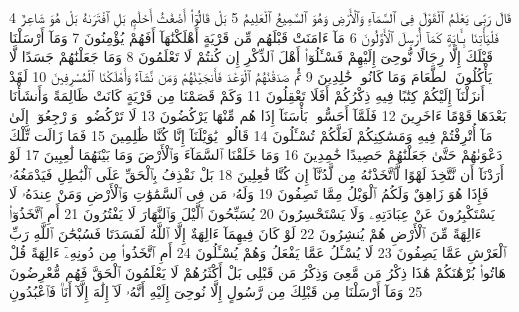 {\tiny\colorbox{cl_aya}{4}} قَالَ رَبِّى يَعْلَمُ ٱلْقَوْلَ فِى ٱلسَّمَآءِ وَٱلْأَرْضِ وَهُوَ ٱلسَّمِيعُ ٱلْعَلِيمُ
{\tiny\colorbox{cl_aya}{5}} بَلْ قَالُوٓا۟ أَضْغَٰثُ أَحْلَٰمٍۭ بَلِ ٱفْتَرَىٰهُ بَلْ هُوَ شَاعِرٌ فَلْيَأْتِنَا بِـَٔايَةٍ كَمَآ أُرْسِلَ ٱلْأَوَّلُونَ
{\tiny\colorbox{cl_aya}{6}} مَآ ءَامَنَتْ قَبْلَهُم مِّن قَرْيَةٍ أَهْلَكْنَٰهَآ أَفَهُمْ يُؤْمِنُونَ
{\tiny\colorbox{cl_aya}{7}} وَمَآ أَرْسَلْنَا قَبْلَكَ إِلَّا رِجَالًا نُّوحِىٓ إِلَيْهِمْ فَسْـَٔلُوٓا۟ أَهْلَ ٱلذِّكْرِ إِن كُنتُمْ لَا تَعْلَمُونَ
{\tiny\colorbox{cl_aya}{8}} وَمَا جَعَلْنَٰهُمْ جَسَدًا لَّا يَأْكُلُونَ ٱلطَّعَامَ وَمَا كَانُوا۟ خَٰلِدِينَ
{\tiny\colorbox{cl_aya}{9}} ثُمَّ صَدَقْنَٰهُمُ ٱلْوَعْدَ فَأَنجَيْنَٰهُمْ وَمَن نَّشَآءُ وَأَهْلَكْنَا ٱلْمُسْرِفِينَ
{\tiny\colorbox{cl_aya}{10}} لَقَدْ أَنزَلْنَآ إِلَيْكُمْ كِتَٰبًا فِيهِ ذِكْرُكُمْ أَفَلَا تَعْقِلُونَ
{\tiny\colorbox{cl_aya}{11}} وَكَمْ قَصَمْنَا مِن قَرْيَةٍ كَانَتْ ظَالِمَةً وَأَنشَأْنَا بَعْدَهَا قَوْمًا ءَاخَرِينَ
{\tiny\colorbox{cl_aya}{12}} فَلَمَّآ أَحَسُّوا۟ بَأْسَنَآ إِذَا هُم مِّنْهَا يَرْكُضُونَ
{\tiny\colorbox{cl_aya}{13}} لَا تَرْكُضُوا۟ وَٱرْجِعُوٓا۟ إِلَىٰ مَآ أُتْرِفْتُمْ فِيهِ وَمَسَٰكِنِكُمْ لَعَلَّكُمْ تُسْـَٔلُونَ
{\tiny\colorbox{cl_aya}{14}} قَالُوا۟ يَٰوَيْلَنَآ إِنَّا كُنَّا ظَٰلِمِينَ
{\tiny\colorbox{cl_aya}{15}} فَمَا زَالَت تِّلْكَ دَعْوَىٰهُمْ حَتَّىٰ جَعَلْنَٰهُمْ حَصِيدًا خَٰمِدِينَ
{\tiny\colorbox{cl_aya}{16}} وَمَا خَلَقْنَا ٱلسَّمَآءَ وَٱلْأَرْضَ وَمَا بَيْنَهُمَا لَٰعِبِينَ
{\tiny\colorbox{cl_aya}{17}} لَوْ أَرَدْنَآ أَن نَّتَّخِذَ لَهْوًا لَّٱتَّخَذْنَٰهُ مِن لَّدُنَّآ إِن كُنَّا فَٰعِلِينَ
{\tiny\colorbox{cl_aya}{18}} بَلْ نَقْذِفُ بِٱلْحَقِّ عَلَى ٱلْبَٰطِلِ فَيَدْمَغُهُۥ فَإِذَا هُوَ زَاهِقٌ وَلَكُمُ ٱلْوَيْلُ مِمَّا تَصِفُونَ
{\tiny\colorbox{cl_aya}{19}} وَلَهُۥ مَن فِى ٱلسَّمَٰوَٰتِ وَٱلْأَرْضِ وَمَنْ عِندَهُۥ لَا يَسْتَكْبِرُونَ عَنْ عِبَادَتِهِۦ وَلَا يَسْتَحْسِرُونَ
{\tiny\colorbox{cl_aya}{20}} يُسَبِّحُونَ ٱلَّيْلَ وَٱلنَّهَارَ لَا يَفْتُرُونَ
{\tiny\colorbox{cl_aya}{21}} أَمِ ٱتَّخَذُوٓا۟ ءَالِهَةً مِّنَ ٱلْأَرْضِ هُمْ يُنشِرُونَ
{\tiny\colorbox{cl_aya}{22}} لَوْ كَانَ فِيهِمَآ ءَالِهَةٌ إِلَّا ٱللَّهُ لَفَسَدَتَا فَسُبْحَٰنَ ٱللَّهِ رَبِّ ٱلْعَرْشِ عَمَّا يَصِفُونَ
{\tiny\colorbox{cl_aya}{23}} لَا يُسْـَٔلُ عَمَّا يَفْعَلُ وَهُمْ يُسْـَٔلُونَ
{\tiny\colorbox{cl_aya}{24}} أَمِ ٱتَّخَذُوا۟ مِن دُونِهِۦٓ ءَالِهَةً قُلْ هَاتُوا۟ بُرْهَٰنَكُمْ هَٰذَا ذِكْرُ مَن مَّعِىَ وَذِكْرُ مَن قَبْلِى بَلْ أَكْثَرُهُمْ لَا يَعْلَمُونَ ٱلْحَقَّ فَهُم مُّعْرِضُونَ
{\tiny\colorbox{cl_aya}{25}} وَمَآ أَرْسَلْنَا مِن قَبْلِكَ مِن رَّسُولٍ إِلَّا نُوحِىٓ إِلَيْهِ أَنَّهُۥ لَآ إِلَٰهَ إِلَّآ أَنَا۠ فَٱعْبُدُونِ
